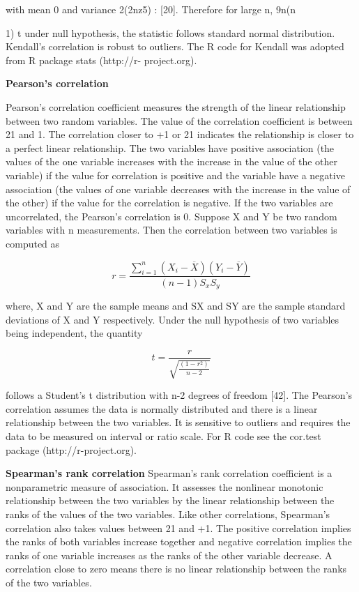 with mean 0 and variance 2(2nz5) : [20]. Therefore for large n, 9n(n{1) t
under null hypothesis, the statistic follows standard normal distribution. Kendall’s correlation is robust to outliers. The R code for Kendall was adopted from R package stats (http://r- project.org).

\textbf{Pearson’s correlation}

Pearson’s correlation coefficient measures the strength of the linear relationship between two random variables. The value of the correlation coefficient is between 21 and 1. The correlation closer to +1 or 21 indicates the relationship is closer to a perfect linear relationship. The two variables have positive association (the values of the one variable increases with the increase in the value of the other variable) if the value for correlation is positive and the variable have a negative association (the values of one variable decreases with the increase in the value of the other) if the value for the correlation is negative. If the two variables are uncorrelated, the Pearson’s correlation is 0.
Suppose X and Y be two random variables with n measurements. Then the correlation between two variables is computed as

\begin{equation}
r = \frac{\sum_{i =1}^{n}(X_i - \overline{X})(Y_i - \overline{Y}) }{(n-1)S_x S_y}
\end{equation}

where, X  and Y  are the sample means and SX and SY are the sample standard deviations of X and Y respectively. Under the null hypothesis of two variables being independent, the quantity

\begin{equation}
t = \frac{r}{\sqrt{\frac{(1-r^2)}{n-2}}}
\end{equation}

follows a Student’s t distribution with n-2 degrees of freedom [42].
The Pearson’s correlation assumes the data is normally distributed and there is a linear relationship between the two variables. It is sensitive to outliers and requires the data to be measured on interval or ratio scale. For R code see the cor.test package (http://r-project.org).

\textbf{Spearman’s rank correlation}
Spearman’s rank correlation coefficient is a nonparametric measure of association. It assesses the nonlinear monotonic relationship between the two variables by the linear relationship between the ranks of the values of the two variables. Like other correlations, Spearman’s correlation also takes values between 21 and +1. The positive correlation implies the ranks of both variables increase together and negative correlation implies the ranks of one variable increases as the ranks of the other variable decrease. A correlation close to zero means there is no linear relationship between the ranks of the two variables.

}

